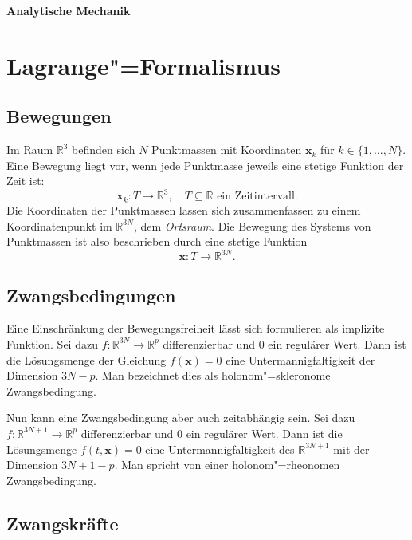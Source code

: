 \documentclass[a4paper,11pt,fleqn,twocolumn,twoside,dvipdfmx]{scrartcl}
\numberwithin{equation}{section}
\newcommand{\bvec}[1]{\mathbf{#1}}
\newcommand{\R}{\mathbb R}
\begin{document}
\thispagestyle{empty}

\begin{huge}
\noindent
\textbf{Analytische Mechanik}
\par
\end{huge}
\vspace{1em}

\tableofcontents

\section{Lagrange"=Formalismus}

\subsection{Bewegungen}

Im Raum $\R^3$ befinden sich $N$ Punktmassen mit Koordinaten
$\bvec x_k$ für $k\in\{1,\ldots,N\}$. Eine Bewegung liegt vor,
wenn jede Punktmasse jeweils eine stetige Funktion der Zeit ist:
\begin{equation}
\bvec x_k\colon T\to\R^3, \quad\text{$T\subseteq\R$ ein Zeitintervall}.
\end{equation}
Die Koordinaten der Punktmassen lassen sich zusammenfassen zu einem
Koordinatenpunkt im $\R^{3N}$, dem \emph{Ortsraum}. Die Bewegung des
Systems von Punktmassen ist also beschrieben durch eine stetige
Funktion
\begin{equation}
\bvec x\colon T\to\R^{3N}.
\end{equation}

\subsection{Zwangsbedingungen}

Eine Einschränkung der Bewegungsfreiheit lässt sich formulieren
als implizite Funktion. Sei dazu $f\colon\R^{3N}\to\R^p$
differenzierbar und $0$ ein regulärer Wert. Dann ist die Lösungsmenge
der Gleichung $f(\bvec x)=0$ eine Untermannigfaltigkeit der Dimension
$3N-p$. Man bezeichnet dies als holonom"=skleronome Zwangsbedingung.

Nun kann eine Zwangsbedingung aber auch zeitabhängig sein. Sei dazu
$f\colon\R^{3N+1}\to\R^p$ differenzierbar und $0$ ein regulärer Wert.
Dann ist die Lösungsmenge $f(t,\bvec x)=0$ eine Untermannigfaltigkeit
des $\R^{3N+1}$ mit der Dimension $3N+1-p$. Man spricht von einer
holonom"=rheonomen Zwangsbedingung.

\subsection{Zwangskräfte}
\end{document}

